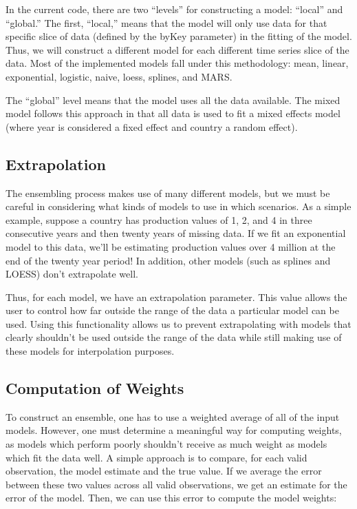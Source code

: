 \documentclass[nojss]{jss}
\begin{document}
In the current code, there are two ``levels'' for constructing a model: ``local'' and ``global.''  The first, ``local,'' means that the model will only use data for that specific slice of data (defined by the byKey parameter) in the fitting of the model.  Thus, we will construct a different model for each different time series slice of the data.  Most of the implemented models fall under this methodology: mean, linear, exponential, logistic, naive, loess, splines, and MARS.

The ``global'' level means that the model uses all the data available.  The mixed model follows this approach in that all data is used to fit a mixed effects model (where year is considered a fixed effect and country a random effect).

\subsection{Extrapolation}

The ensembling process makes use of many different models, but we must be careful in considering what kinds of models to use in which scenarios.  As a simple example, suppose a country has production values of 1, 2, and 4 in three consecutive years and then twenty years of missing data.  If we fit an exponential model to this data, we'll be estimating production values over 4 million at the end of the twenty year period!  In addition, other models (such as splines and LOESS) don't extrapolate well.

Thus, for each model, we have an extrapolation parameter.  This value allows the user to control how far outside the range of the data a particular model can be used.  Using this functionality allows us to prevent extrapolating with models that clearly shouldn't be used outside the range of the data while still making use of these models for interpolation purposes.

\subsection{Computation of Weights}

To construct an ensemble, one has to use a weighted average of all of the input models.  However, one  must determine a meaningful way for computing weights, as models which perform poorly shouldn't receive as much weight as models which fit the data well.  A simple approach is to compare, for each valid observation, the model estimate and the true value.  If we average the error between these two values across all valid observations, we get an estimate for the error of the model.  Then, we can use this error to compute the model weights:
\end{document}
